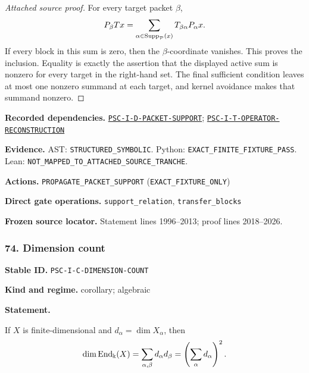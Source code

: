 \documentclass[a4paper,11pt]{article}
\newcommand{\bbk}{\Bbbk}\newcommand{\A}{\mathcal A}\newcommand{\B}{\mathcal B}\newcommand{\Ccal}{\mathcal C}\newcommand{\Pcal}{\mathcal P}\newcommand{\Qcal}{\mathcal Q}\newcommand{\Rcal}{\mathcal R}\newcommand{\Scal}{\mathcal S}
\newcommand{\field}[2]{\noindent\textbf{#1.} #2\par}
\begin{document}
\begin{proof}[Attached source proof]
For every target packet \(\beta\),
\[
P_\beta Tx
=
\sum_{\alpha\in\Supp_{\Pcal}(x)}T_{\beta\alpha}P_\alpha x.
\]
If every block in this sum is zero, then the \(\beta\)-coordinate vanishes.  This proves the inclusion.  Equality is exactly the assertion that the displayed active sum is nonzero for every target in the right-hand set.  The final sufficient condition leaves at most one nonzero summand at each target, and kernel avoidance makes that summand nonzero.
\end{proof}
\field{Recorded dependencies}{\hyperref[rec:PSC-I-D-PACKET-SUPPORT]{\nolinkurl{PSC-I-D-PACKET-SUPPORT}}; \hyperref[rec:PSC-I-T-OPERATOR-RECONSTRUCTION]{\nolinkurl{PSC-I-T-OPERATOR-RECONSTRUCTION}}}
\field{Evidence}{AST: \nolinkurl{STRUCTURED_SYMBOLIC}. Python: \nolinkurl{EXACT_FINITE_FIXTURE_PASS}. Lean: \nolinkurl{NOT_MAPPED_TO_ATTACHED_SOURCE_TRANCHE}.}
\field{Actions}{\nolinkurl{PROPAGATE_PACKET_SUPPORT} (\nolinkurl{EXACT_FIXTURE_ONLY})}
\field{Direct gate operations}{\nolinkurl{support_relation}, \nolinkurl{transfer_blocks}}
\field{Frozen source locator}{Statement lines 1996--2013; proof lines 2018--2026.}
\subsubsection*{74. Dimension count}
\label{rec:PSC-I-C-DIMENSION-COUNT}
\field{Stable ID}{\nolinkurl{PSC-I-C-DIMENSION-COUNT}}
\field{Kind and regime}{corollary; algebraic}
\textbf{Statement.}\par
If $X$ is finite-dimensional and $d_\alpha=\dim X_\alpha$, then
\[
\dim\End_{\bbk}(X)
=
\sum_{\alpha,\beta}d_\alpha d_\beta
=
\left(\sum_\alpha d_\alpha\right)^2.
\]
\end{document}
